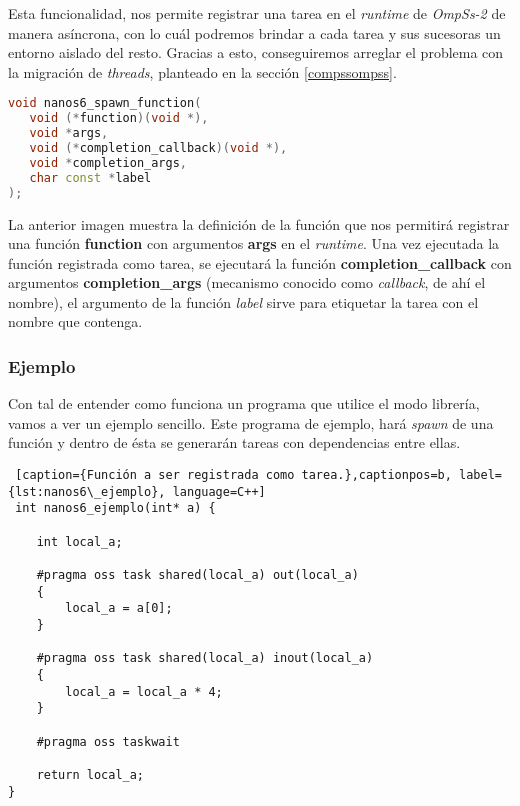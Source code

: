 Esta funcionalidad, nos permite registrar una tarea en el \textit{runtime} de \textit{OmpSs-2} de manera asíncrona, con lo cuál podremos brindar a cada tarea y sus sucesoras un entorno aislado del resto. Gracias a esto, conseguiremos arreglar el problema con la migración de \textit{threads}, planteado en la sección \ref{compssompss}. \smallskip

\begin{lstlisting}[caption={Definición de la función nanos6\_spawn\_function.},captionpos=b, label={lst:nanos6spawn}, language=C++]
void nanos6_spawn_function(
   void (*function)(void *), 
   void *args,
   void (*completion_callback)(void *), 
   void *completion_args, 
   char const *label
);
\end{lstlisting}

La anterior imagen muestra la definición de la función que nos permitirá registrar una función \textbf{function} con argumentos \textbf{args} en el \textit{runtime}. Una vez ejecutada la función registrada como tarea, se ejecutará la función \textbf{completion\_callback} con argumentos \textbf{completion\_args} (mecanismo conocido como \textit{callback}, de ahí el nombre), el argumento de la función \textit{label} sirve para etiquetar la tarea con el nombre que contenga.

\subsubsection{Ejemplo}
\label{sec:ejemplo}

Con tal de entender como funciona un programa que utilice el modo librería, vamos a ver un ejemplo sencillo. Este programa de ejemplo, hará \textit{spawn} de una función y dentro de ésta se generarán tareas con dependencias entre ellas. \smallskip

\begin{lstlisting} [caption={Función a ser registrada como tarea.},captionpos=b, label={lst:nanos6\_ejemplo}, language=C++]
 int nanos6_ejemplo(int* a) {

    int local_a;

    #pragma oss task shared(local_a) out(local_a) 
    {
        local_a = a[0];
    }

    #pragma oss task shared(local_a) inout(local_a)
    {
        local_a = local_a * 4;
    }

    #pragma oss taskwait

    return local_a;
}
\end{lstlisting}

